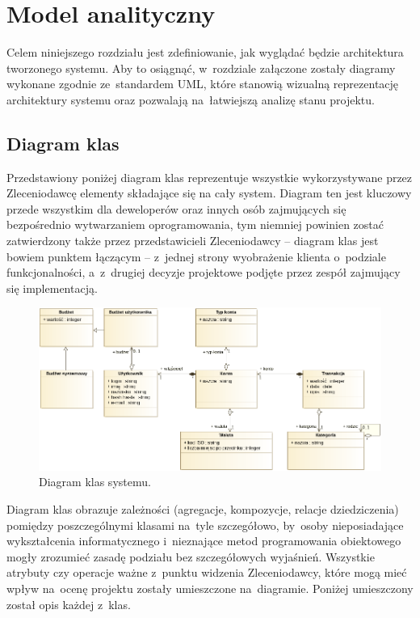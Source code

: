 \section{Model analityczny}
Celem niniejszego rozdziału jest zdefiniowanie, jak wyglądać będzie architektura tworzonego systemu. Aby to osiągnąć, w~rozdziale załączone zostały diagramy wykonane zgodnie ze~standardem UML, które stanowią wizualną reprezentację architektury systemu oraz pozwalają na~łatwiejszą analizę stanu projektu.

\subsection{Diagram klas}
Przedstawiony poniżej diagram klas reprezentuje wszystkie wykorzystywane przez Zleceniodawcę elementy składające się na cały system. Diagram ten jest kluczowy przede wszystkim dla deweloperów oraz innych osób zajmujących się bezpośrednio wytwarzaniem oprogramowania, tym niemniej powinien zostać zatwierdzony także przez przedstawicieli Zleceniodawcy -- diagram klas jest bowiem punktem łączącym -- z~jednej strony wyobrażenie klienta o~podziale funkcjonalności, a~z~drugiej decyzje projektowe podjęte przez zespół zajmujący się implementacją.\\

\begin{figure}[H]
  \centering
  \includegraphics[width=\textwidth]{images/class-diagram.png}
  \caption{Diagram klas systemu.}
\end{figure}

Diagram klas obrazuje zależności (agregacje, kompozycje, relacje dziedziczenia) pomiędzy poszczególnymi klasami na~tyle szczegółowo, by~osoby nieposiadające wykształcenia informatycznego i~nieznające metod programowania obiektowego mogły zrozumieć zasadę podziału bez szczegółowych wyjaśnień. Wszystkie atrybuty czy operacje ważne z~punktu widzenia Zleceniodawcy, które mogą mieć wpływ na~ocenę projektu zostały umieszczone na~diagramie. Poniżej umieszczony został opis każdej z~klas.\\

